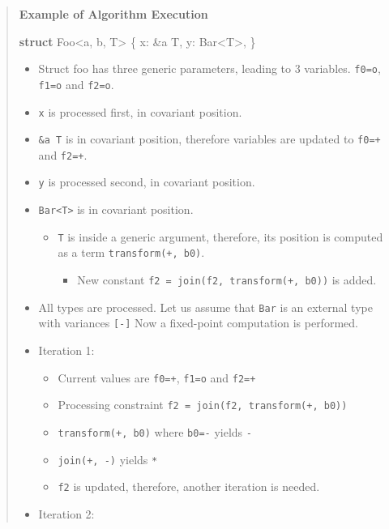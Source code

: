 \documentclass[
  11pt,
  twoside,symmetric]{report}
\newenvironment{Shaded}{}{}
\newcommand{\KeywordTok}[1]{\textbf{#1}}
\newcommand{\NormalTok}[1]{#1}
\newcommand{\OperatorTok}[1]{#1}
\newcommand{\OtherTok}[1]{#1}
\providecommand{\tightlist}{%
  \setlength{\itemsep}{0pt}\setlength{\parskip}{0pt}}
\begin{document}
\begin{quote}
\textbf{Example of Algorithm Execution}

\begin{Shaded}
\begin{Highlighting}[]
 \KeywordTok{struct}\NormalTok{ Foo}\OperatorTok{\textless{}}\OtherTok{\textquotesingle{}a}\OperatorTok{,} \OtherTok{\textquotesingle{}b}\OperatorTok{,}\NormalTok{ T}\OperatorTok{\textgreater{}} \OperatorTok{\{}
\NormalTok{     x}\OperatorTok{:} \OperatorTok{\&}\OtherTok{\textquotesingle{}a}\NormalTok{ T}\OperatorTok{,}
\NormalTok{     y}\OperatorTok{:}\NormalTok{ Bar}\OperatorTok{\textless{}}\NormalTok{T}\OperatorTok{\textgreater{},}
 \OperatorTok{\}}
\end{Highlighting}
\end{Shaded}

\begin{itemize}
\tightlist
\item
  Struct foo has three generic parameters, leading to 3 variables.
  \texttt{f0=o}, \texttt{f1=o} and \texttt{f2=o}.
\item
  \texttt{x} is processed first, in covariant position.
\item
  \texttt{\&\textquotesingle{}a\ T} is in covariant position, therefore
  variables are updated to \texttt{f0=+} and \texttt{f2=+}.
\item
  \texttt{y} is processed second, in covariant position.
\item
  \texttt{Bar\textless{}T\textgreater{}} is in covariant position.

  \begin{itemize}
  \tightlist
  \item
    \texttt{T} is inside a generic argument, therefore, its position is
    computed as a term \texttt{transform(+,\ b0)}.

    \begin{itemize}
    \tightlist
    \item
      New constant \texttt{f2\ =\ join(f2,\ transform(+,\ b0))} is
      added.
    \end{itemize}
  \end{itemize}
\item
  All types are processed. Let us assume that \texttt{Bar} is an
  external type with variances \texttt{{[}-{]}} Now a fixed-point
  computation is performed.
\item
  Iteration 1:

  \begin{itemize}
  \tightlist
  \item
    Current values are \texttt{f0=+}, \texttt{f1=o} and \texttt{f2=+}
  \item
    Processing constraint \texttt{f2\ =\ join(f2,\ transform(+,\ b0))}
  \item
    \texttt{transform(+,\ b0)} where \texttt{b0=-} yields \texttt{-}
  \item
    \texttt{join(+,\ -)} yields \texttt{*}
  \item
    \texttt{f2} is updated, therefore, another iteration is needed.
  \end{itemize}
\item
  Iteration 2:


\end{itemize}
\end{quote}
\end{document}
